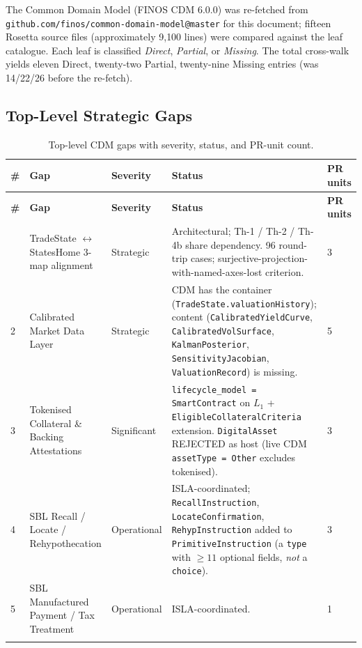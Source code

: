 \documentclass[11pt,a4paper]{article}
\begin{document}
The Common Domain Model (FINOS CDM 6.0.0) was re-fetched from \texttt{github.com/finos/common-domain-model@master} for this document; fifteen Rosetta source files (approximately 9{,}100 lines) were compared against the leaf catalogue. Each leaf is classified \emph{Direct}, \emph{Partial}, or \emph{Missing}. The total cross-walk yields eleven Direct, twenty-two Partial, twenty-nine Missing entries (was 14/22/26 before the re-fetch).

\subsection{Top-Level Strategic Gaps}
\label{sec:cdm-strategic}

\begin{center}
\renewcommand{\arraystretch}{1.15}
\begin{longtable}{@{}p{0.6cm}p{4.0cm}p{2.5cm}p{6.5cm}p{2cm}@{}}
\toprule
\textbf{\#} & \textbf{Gap} & \textbf{Severity} & \textbf{Status} & \textbf{PR units} \\
\midrule
\endfirsthead
\toprule
\textbf{\#} & \textbf{Gap} & \textbf{Severity} & \textbf{Status} & \textbf{PR units} \\
\midrule
\endhead
\bottomrule
\endfoot
1 & TradeState $\leftrightarrow$ StatesHome 3-map alignment & Strategic & Architectural; Th-1 / Th-2 / Th-4b share dependency. 96 round-trip cases; surjective-projection-with-named-axes-lost criterion. & 3 \\
2 & Calibrated Market Data Layer & Strategic & CDM has the container (\texttt{TradeState.valuationHistory}); content (\texttt{CalibratedYieldCurve}, \texttt{CalibratedVolSurface}, \texttt{KalmanPosterior}, \texttt{SensitivityJacobian}, \texttt{ValuationRecord}) is missing. & 5 \\
3 & Tokenised Collateral \& Backing Attestations & Significant & \texttt{lifecycle\_model = SmartContract} on $L_1$ + \texttt{EligibleCollateralCriteria} extension. \texttt{DigitalAsset} REJECTED as host (live CDM \texttt{assetType = Other} excludes tokenised). & 3 \\
4 & SBL Recall / Locate / Rehypothecation & Operational & ISLA-coordinated; \texttt{RecallInstruction}, \texttt{LocateConfirmation}, \texttt{RehypInstruction} added to \texttt{PrimitiveInstruction} (a \texttt{type} with $\ge 11$ optional fields, \emph{not} a \texttt{choice}). & 3 \\
5 & SBL Manufactured Payment / Tax Treatment & Operational & ISLA-coordinated. & 1 \\
\caption{Top-level CDM gaps with severity, status, and PR-unit count.}
\label{tab:cdm-strategic}
\end{longtable}
\end{center}
\end{document}
